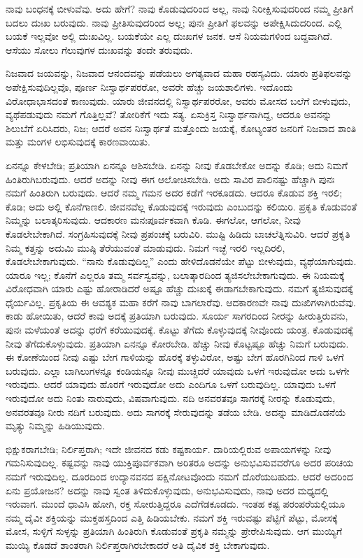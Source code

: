 ನಾವು ಬಂಧನಕ್ಕೆ ಬೀಳುವೆವು. ಅದು ಹೇಗೆ? ನಾವು ಕೊಡುವುದರಿಂದ ಅಲ್ಲ, ನಾವು ನಿರೀಕ್ಷಿಸುವುದರಿಂದ ನಮ್ಮ ಪ್ರೀತಿಗೆ ಬದಲು ದುಃಖ ಬರುವುದು. ನಾವು ಪ್ರೀತಿಸುವುದರಿಂದ ಅಲ್ಲ; ಪುನಃ ಪ್ರೀತಿಗೆ ಫಲವನ್ನು ಅಪೇಕ್ಷಿಸಿದುದರಿಂದ. ಎಲ್ಲಿ ಬಯಕೆ ಇಲ್ಲವೋ ಅಲ್ಲಿ ದುಃಖವಿಲ್ಲ. ಬಯಕೆಯೇ ಎಲ್ಲ ದುಃಖಗಳ ಜನಕ. ಆಸೆ ನಿಯಮಗಳಿಂದ ಬದ್ದವಾಗಿದೆ. ಆಸೆಯು ಸೋಲು ಗೆಲುವುಗಳ ದುಃಖವನ್ನು ತಂದೇ ತರುವುದು.

ನಿಜವಾದ ಜಯವನ್ನು, ನಿಜವಾದ ಆನಂದವನ್ನು ಪಡೆಯಲು ಅಗತ್ಯವಾದ ಮಹಾ ರಹಸ್ಯವಿದು. ಯಾರು ಪ್ರತಿಫಲವನ್ನು ಅಪೇಕ್ಷಿಸುವುದಿಲ್ಲವೊ, ಪೂರ್ಣ ನಿಃಸ್ವಾರ್ಥಪರರೋ, ಅವರೇ ಹೆಚ್ಚು ಜಯಶಾಲಿಗಳು. ಇದೊಂದು ವಿರೋಧಾಭಾಸದಂತೆ ಕಾಣುವುದು. ಯಾರು ಜೀವನದಲ್ಲಿ ನಿಸ್ವಾರ್ಥಪರರೋ, ಅವರು ಮೋಸದ ಬಲೆಗೆ ಬೀಳುವುದು, ವ್ಯಥೆಪಡುವುದು ನಮಗೆ ಗೊತ್ತಿಲ್ಲವೆ? ತೋರಿಕೆಗೆ ಇದು ಸತ್ಯ. ಏಸುಕ್ರಿಸ್ತ ನಿಃಸ್ವಾರ್ಥನಾಗಿದ್ದ, ಆದರೂ ಅವನನ್ನು ಶಿಲುಬೆಗೆ ಏರಿಸಿದರು, ನಿಜ; ಆದರೆ ಅವನ ನಿಃಸ್ವಾರ್ಥತೆ ಮತ್ತೊಂದು ಜಯಕ್ಕೆ, ಕೋಟ್ಯಂತರ ಜನರಿಗೆ ನಿಜವಾದ ಶಾಂತಿ ಮತ್ತು ಮಂಗಳ ಲಭಿಸುವುದಕ್ಕೆ ಕಾರಣವಾಯಿತು.

ಏನನ್ನೂ ಕೇಳಬೇಡಿ; ಪ್ರತಿಯಾಗಿ ಏನನ್ನೂ ಆಶಿಸಬೇಡಿ. ಏನನ್ನು ನೀವು ಕೊಡಬೇಕೋ ಅದನ್ನು ಕೊಡಿ; ಅದು ನಿಮಗೆ ಹಿಂತಿರುಗಿಬರುವುದು. ಆದರೆ ಅದನ್ನು ನೀವು ಈಗ ಆಲೋಚಿಸಬೇಡಿ. ಅದು ಸಾವಿರ ಪಾಲಿನಷ್ಟು ಹೆಚ್ಚಾಗಿ ಪುನಃ ನಮಗೆ ಹಿಂತಿರುಗಿ ಬರುವುದು. ಆದರೆ ನಮ್ಮ ಗಮನ ಅದರ ಕಡೆಗೆ ಇರಕೂಡದು. ಆದರೂ ಕೊಡುವ ಶಕ್ತಿ ಇರಲಿ; ಕೊಡಿ; ಅದು ಅಲ್ಲಿ ಕೊನೆಗಾಣಲಿ. ಜೀವನವೆಲ್ಲ ಕೊಡುವುದಕ್ಕೆ ಇರುವುದು ಎಂಬುದನ್ನು ಕಲಿಯಿರಿ. ಪ್ರಕೃತಿ ಕೊಡುವಂತೆ ನಿಮ್ಮನ್ನು ಬಲಾತ್ಕರಿಸುವುದು. ಆದಕಾರಣ ಮನಃಪೂರ್ವಕವಾಗಿ ಕೊಡಿ. ಈಗಲೋ, ಆಗಲೋ, ನೀವು ಕೊಡಲೇಬೇಕಾಗಿದೆ. ಸಂಗ್ರಹಿಸುವುದಕ್ಕೆ ನೀವು ಪ್ರಪಂಚಕ್ಕೆ ಬರುವಿರಿ. ಮುಷ್ಟಿ ಹಿಡಿದು ಬಾಚಲೆತ್ನಿಸುವಿರಿ. ಆದರೆ ಪ್ರಕೃತಿ ನಿಮ್ಮ ಕತ್ತನ್ನು ಅದುಮಿ ಮುಷ್ಠಿ ತೆರೆಯುವಂತೆ ಮಾಡುವುದು. ನಿಮಗೆ ಇಚ್ಛೆ ಇರಲಿ ಇಲ್ಲದಿರಲಿ, ಕೊಡಲೇಬೇಕಾಗುವುದು. “ನಾನು ಕೊಡುವುದಿಲ್ಲ” ಎಂದು ಹೇಳಿದೊಡನೆಯೇ ಪೆಟ್ಟು ಬೀಳುವುದು, ವ್ಯಥೆಯಾಗುವುದು. ಯಾರೂ ಇಲ್ಲ; ಕೊನೆಗೆ ಎಲ್ಲರೂ ತಮ್ಮ ಸರ್ವಸ್ವವನ್ನು, ಬಲಾತ್ಕಾರದಿಂದ ತ್ಯಜಿಸಲೇಬೇಕಾಗುವುದು. ಈ ನಿಯಮಕ್ಕೆ ವಿರೋಧವಾಗಿ ಯಾರು ಎಷ್ಟು ಹೋರಾಡಿದರೆ ಅಷ್ಟೂ ಹೆಚ್ಚು ದುಃಖಕ್ಕೆ ಈಡಾಗಬೇಕಾಗುವುದು. ನಮಗೆ ತ್ಯಜಿಸುವುದಕ್ಕೆ ಧೈರ್ಯವಿಲ್ಲ. ಪ್ರಕೃತಿಯ ಈ ಆವಶ್ಯಕ ಮಹಾ ಕರೆಗೆ ನಾವು ಬಾಗಲಾರೆವು. ಆದಕಾರಣವೇ ನಾವು ದುಃಖಿಗಳಾಗಿರುವೆವು. ಕಾಡು ಹೋಯಿತು, ಆದರೆ ಕಾವು ಅದಕ್ಕೆ ಪ್ರತಿಯಾಗಿ ಬರುವುದು. ಸೂರ್ಯ ಸಾಗರದಿಂದ ನೀರನ್ನು ಹೀರುತ್ತಿರುವನು, ಪುನಃ ಮಳೆಯಂತೆ ಅದನ್ನು ಧರೆಗೆ ಕರೆಯುವುದಕ್ಕೆ. ಕೊಟ್ಟು ತೆಗೆದು ಕೊಳ್ಳುವುದಕ್ಕೆ ನೀವೊಂದು ಯಂತ್ರ. ಕೊಡುವುದಕ್ಕೆ ನೀವು ತೆಗೆದುಕೊಳ್ಳುವುದು. ಪ್ರತಿಯಾಗಿ ಏನನ್ನೂ ಕೋರಬೇಡಿ. ಹೆಚ್ಚು ನೀವು ಕೊಟ್ಟಷ್ಟೂ ಹೆಚ್ಚು ನಿಮಗೆ ಬರುವುದು. ಈ ಕೋಣೆಯಿಂದ ನೀವು ಎಷ್ಟು ಬೇಗ ಗಾಳಿಯನ್ನು ಹೊರಕ್ಕೆ ತಳ್ಳುವಿರೋ, ಅಷ್ಟು ಬೇಗ ಹೊರಗಿನಿಂದ ಗಾಳಿ ಒಳಗೆ ಬರುವುದು. ಎಲ್ಲಾ ಬಾಗಿಲುಗಳನ್ನೂ ಕಂಡಿಯನ್ನೂ ನೀವು ಮುಚ್ಚಿದರೆ ಯಾವುದು ಒಳಗೆ ಇರುವುದೋ ಅದು ಒಳಗೇ ಇರುವುದು. ಆದರೆ ಯಾವುದು ಹೊರಗೆ ಇರುವುದೋ ಅದು ಎಂದಿಗೂ ಒಳಗೆ ಬರುವುದಿಲ್ಲ. ಯಾವುದು ಒಳಗೆ ಇರುವುದೋ ಅದು ನಿಂತು ನಾರುವುದು, ವಿಷವಾಗುವುದು. ನದಿ ಅನವರತವೂ ಸಾಗರಕ್ಕೆ ನೀರನ್ನು ಕೊಡುವುದು, ಅನವರತವೂ ನೀರು ನದಿಗೆ ಬರುವುದು. ಅದು ಸಾಗರಕ್ಕೆ ಸೇರುವುದನ್ನು ತಡೆಯ ಬೇಡಿ. ಅದನ್ನು ಮಾಡಿದೊಡನೆಯೆ ಮೃತ್ಯು ನಿಮ್ಮನ್ನು ಹಿಡಿಯುವುದು.

ಭಿಕ್ಷುಕರಾಗಬೇಡಿ; ನಿರ್ಲಿಪ್ತರಾಗಿ; ಇದೇ ಜೀವನದ ಕಡು ಕಷ್ಟಕಾರ್ಯ. ದಾರಿಯಲ್ಲಿರುವ ಅಪಾಯಗಳನ್ನು ನೀವು ಗಮನಿಸುವುದಿಲ್ಲ. ಕಷ್ಟವನ್ನು ನಾವು ಯುಕ್ತಿಪೂರ್ವಕವಾಗಿ ಅರಿತರೂ ಅದನ್ನು ಅನುಭವಿಸುವವರೆಗೂ ಅದರ ಪರಿಚಯ ನಮಗೆ ಇರುವುದಿಲ್ಲ. ದೂರದಿಂದ ಉದ್ಯಾನವನದ ಪಕ್ಷಿನೋಟವೊಂದು ನಮಗೆ ದೊರೆಯಬಹುದು. ಆದರೆ ಅದರಿಂದ ಏನು ಪ್ರಯೋಜನ? ಅದನ್ನು ನಾವು ಸ್ವಂತ ತಿಳಿದುಕೊಳ್ಳುವುದು, ಅನುಭವಿಸುವುದು, ನಾವು ಅದರ ಮಧ್ಯದಲ್ಲಿ ಇರುವಾಗ. ಮುಂದೆ ಧಾವಿಸಿ ಹೋಗಿ, ರಕ್ತ ಸೋರುತ್ತಿದ್ದರೂ ಎದೆಗೆಡಕೂಡದು. ಇಂತಹ ಕಷ್ಟ ಪರಂಪರೆಯಲ್ಲಿಯೂ ನಮ್ಮ ದೈವೀ ಶಕ್ತಿಯನ್ನು ಮುಕ್ತಹಸ್ತದಿಂದ ಎತ್ತಿ ಹಿಡಿಯಬೇಕು. ನಮಗೆ ಶಕ್ತಿ ಇರುವಷ್ಟು ಪೆಟ್ಟಿಗೆ ಪೆಟ್ಟು, ಮೋಸಕ್ಕೆ ಮೋಸ, ಸುಳ್ಳಿಗೆ ಸುಳ್ಳನ್ನು ಪ್ರತಿಯಾಗಿ ಹಿಂತಿರುಗಿ ಕೊಡುವಂತೆ ಪ್ರಕೃತಿ ನಮ್ಮನ್ನು ಪ್ರೇರೇಪಿಸುವುದು. ಆಗ ಮುಯ್ಯಿಗೆ ಮುಯ್ಯಿ ಕೊಡದೆ ಶಾಂತರಾಗಿ ನಿರ್ಲಿಪ್ತರಾಗಿರಬೇಕಾದರೆ ಅತಿ ದೈವಿಕ ಶಕ್ತಿ ಬೇಕಾಗುವುದು.

